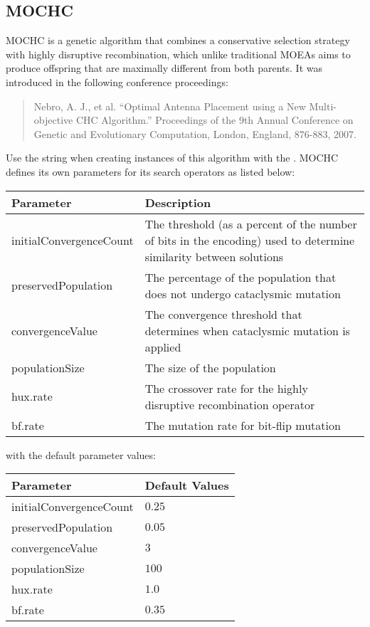 \subsection{MOCHC}
MOCHC is a genetic algorithm that combines a conservative selection strategy with highly disruptive recombination, which unlike traditional MOEAs aims to produce offspring that are maximally different from both parents.  It was introduced in the following conference proceedings:
\begin{quote}
Nebro, A. J., et al.  ``Optimal Antenna Placement using a New Multi-objective CHC Algorithm.''  Proceedings of the 9th Annual Conference on Genetic and Evolutionary Computation, London, England, 876-883, 2007.
\end{quote}
Use the string  when creating instances of this algorithm with the .  MOCHC defines its own parameters for its search operators as listed below:
\newline
\newline
\begin{tabularx}{\linewidth}{lX}
  \hline
  Parameter & Description \\
  \hline
  initialConvergenceCount & The threshold (as a percent of the number of bits in the encoding) used to determine similarity between solutions \\
  preservedPopulation & The percentage of the population that does not undergo cataclysmic mutation  \\
  convergenceValue & The convergence threshold that determines when cataclysmic mutation is applied \\
  populationSize & The size of the population \\
  hux.rate & The crossover rate for the highly disruptive recombination operator \\
  bf.rate & The mutation rate for bit-flip mutation \\
  \hline
\end{tabularx}
\newline
\newline
with the default parameter values:
\newline
\newline
\begin{tabularx}{\linewidth}{lX}
  \hline
  Parameter & Default Values \\
  \hline
  initialConvergenceCount & $0.25$ \\
  preservedPopulation & $0.05$ \\
  convergenceValue & $3$ \\
  populationSize & $100$ \\
  hux.rate & $1.0$ \\
  bf.rate & $0.35$ \\
  \hline
\end{tabularx}



